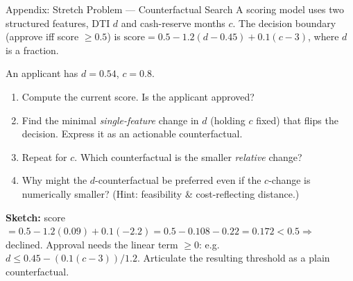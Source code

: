 \documentclass[9pt,t]{beamer}
\begin{document}

\begin{frame}[noframenumbering]{Appendix: Stretch Problem --- Counterfactual Search}
A scoring model uses two structured features, DTI $d$ and cash-reserve months $c$.
The decision boundary (approve iff score $\geq 0.5$) is
$\text{score} = 0.5 - 1.2(d - 0.45) + 0.1(c - 3)$, where $d$ is a fraction.

\medskip
An applicant has $d=0.54$, $c=0.8$.
\begin{enumerate}\small
  \item Compute the current score. Is the applicant approved?
  \item Find the minimal \emph{single-feature} change in $d$ (holding $c$ fixed)
        that flips the decision. Express it as an actionable counterfactual.
  \item Repeat for $c$. Which counterfactual is the smaller \emph{relative} change?
  \item Why might the $d$-counterfactual be preferred even if the $c$-change is
        numerically smaller? (Hint: feasibility \& cost-reflecting distance.)
\end{enumerate}

\medskip
\textbf{Sketch:} score $= 0.5 - 1.2(0.09) + 0.1(-2.2) = 0.5 - 0.108 - 0.22 =
0.172 < 0.5 \Rightarrow$ declined. Approval needs the linear term $\geq 0$: e.g.\
$d \leq 0.45 - (0.1(c-3))/1.2$. Articulate the resulting threshold as a plain
counterfactual.
\end{frame}
\end{document}
